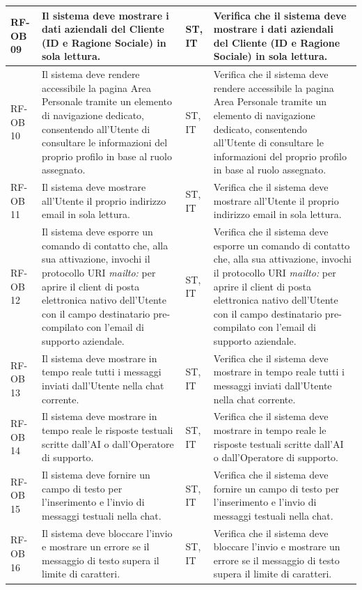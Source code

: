 \documentclass[a4paper,11pt,oneside]{scrartcl}
\begin{document}
\begin{longtable}{|p{1.5cm}|p{4.5cm}|p{1.8cm}|p{6cm}|}
RF-OB 09 & Il sistema deve mostrare i dati aziendali del Cliente (ID e Ragione Sociale) in sola lettura. & ST, IT & Verifica che il sistema deve mostrare i dati aziendali del Cliente (ID e Ragione Sociale) in sola lettura. \\ \hline
RF-OB 10 & Il sistema deve rendere accessibile la pagina Area Personale tramite un elemento di navigazione dedicato, consentendo all'Utente di consultare le informazioni del proprio profilo in base al ruolo assegnato. & ST, IT & Verifica che il sistema deve rendere accessibile la pagina Area Personale tramite un elemento di navigazione dedicato, consentendo all'Utente di consultare le informazioni del proprio profilo in base al ruolo assegnato. \\ \hline
RF-OB 11 & Il sistema deve mostrare all'Utente il proprio indirizzo email in sola lettura. & ST, IT & Verifica che il sistema deve mostrare all'Utente il proprio indirizzo email in sola lettura. \\ \hline
RF-OB 12 & Il sistema deve esporre un comando di contatto che, alla sua attivazione, invochi il protocollo URI \textit{mailto:} per aprire il client di posta elettronica nativo dell'Utente con il campo destinatario pre-compilato con l'email di supporto aziendale. & ST, IT & Verifica che il sistema deve esporre un comando di contatto che, alla sua attivazione, invochi il protocollo URI \textit{mailto:} per aprire il client di posta elettronica nativo dell'Utente con il campo destinatario pre-compilato con l'email di supporto aziendale. \\ \hline
RF-OB 13 & Il sistema deve mostrare in tempo reale tutti i messaggi inviati dall'Utente nella chat corrente. & ST, IT & Verifica che il sistema deve mostrare in tempo reale tutti i messaggi inviati dall'Utente nella chat corrente. \\ \hline
RF-OB 14 & Il sistema deve mostrare in tempo reale le risposte testuali scritte dall'AI o dall'Operatore di supporto. & ST, IT & Verifica che il sistema deve mostrare in tempo reale le risposte testuali scritte dall'AI o dall'Operatore di supporto. \\ \hline
RF-OB 15 & Il sistema deve fornire un campo di testo per l'inserimento e l'invio di messaggi testuali nella chat. & ST, IT & Verifica che il sistema deve fornire un campo di testo per l'inserimento e l'invio di messaggi testuali nella chat. \\ \hline
RF-OB 16 & Il sistema deve bloccare l'invio e mostrare un errore se il messaggio di testo supera il limite di caratteri. & ST, IT & Verifica che il sistema deve bloccare l'invio e mostrare un errore se il messaggio di testo supera il limite di caratteri. \\ \hline

\end{longtable}
\end{document}
